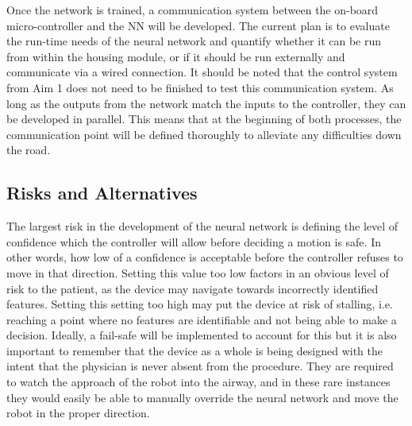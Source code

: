 Once the network is trained, a communication system between the on-board micro-controller and the NN will be developed. The current plan is to evaluate the run-time needs of the neural network and quantify whether it can be run from within the housing module, or if it should be run externally and communicate via a wired connection. It should be noted that the control system from Aim 1 does not need to be finished to test this communication system. As long as the outputs from the network match the inputs to the controller, they can be developed in parallel. This means that at the beginning of both processes, the communication point will be defined thoroughly to alleviate any difficulties down the road.

\subsection{Risks and Alternatives}

The largest risk in the development of the neural network is defining the level of confidence which the controller will allow before deciding a motion is safe. In other words, how low of a confidence is acceptable before the controller refuses to move in that direction. Setting this value too low factors in an obvious level of risk to the patient, as the device may navigate towards incorrectly identified features. Setting this setting too high may put the device at risk of stalling, i.e. reaching a point where no features are identifiable and not being able to make a decision. Ideally, a fail-safe will be implemented to account for this but it is also important to remember that the device as a whole is being designed with the intent that the physician is never absent from the procedure. They are required to watch the approach of the robot into the airway, and in these rare instances they would easily be able to manually override the neural network and move the robot in the proper direction.